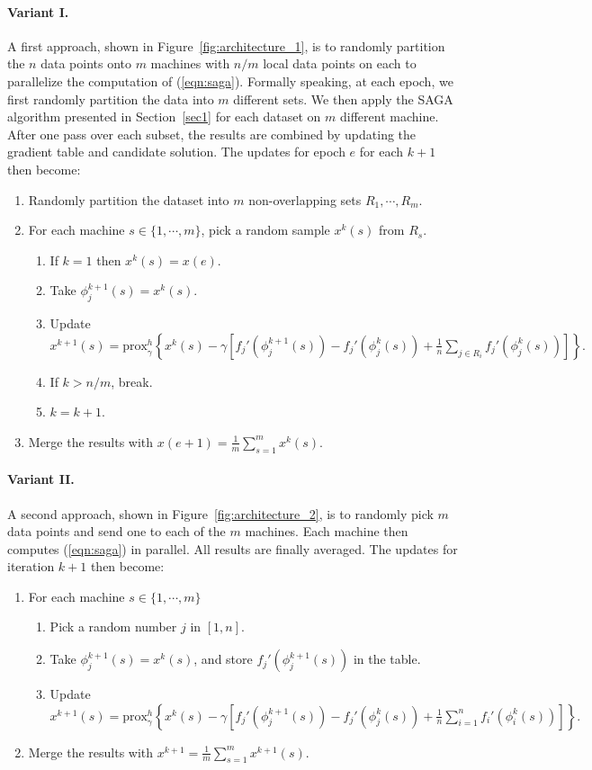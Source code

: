 \documentclass[a4paper,11pt]{article}
\newcommand{\eqnref}[1]{(\ref{eqn:#1})}
\newcommand{\figref}[1]{Figure~\ref{fig:#1}}
\newcommand{\prox}{\textrm{prox}}
\begin{document}
\paragraph{Variant I.} A first approach, shown in \figref{architecture_1}, is to
randomly partition the $n$ data points onto $m$ machines with $n/m$ local data
points on each to parallelize the computation of \eqnref{saga}. Formally
speaking, at each epoch, we first randomly partition the data into $m$ different
sets. We then apply the SAGA algorithm presented in Section~\ref{sec1} for each
dataset on $m$ different machine. After one pass over each subset, the results
are combined by updating the gradient table and candidate solution. The updates
for epoch $e$ for each $k+1$ then become:
\begin{enumerate}
	\item Randomly partition the dataset into $m$ non-overlapping sets $R_1,
		\cdots, R_m$.
	\item For each machine $s \in \{ 1, \cdots, m \}$, pick a random sample
		$x^k(s)$ from $R_s$.
	\begin{enumerate}
		\item If $ k = 1 $ then $x^k(s) = x(e)$.
		\item Take $\phi_j^{k+1}(s) = x^k(s)$.
		\item Update $x^{k+1}(s) = \prox_\gamma^h \left\{ 
			x^k(s) - \gamma \left[ f_j'(\phi_j^{k+1}(s)) - f_j'(\phi_j^k(s))
			+ \frac1n \sum_{j \in R_i} f_j'(\phi_j^k(s)) \right] \right\}.$
		\item If $ k > n/m$, break.
		\item $k = k+1$.
	\end{enumerate}	
	\item Merge the results with $ x(e+1) = \frac{1}{m} \sum_{s=1}^m x^k(s)$.
\end{enumerate}

\paragraph{Variant II.} A second approach, shown in \figref{architecture_2},
is to randomly pick $m$ data points and send one to each of the $m$ machines.
Each machine then computes \eqnref{saga} in parallel. All results are finally
averaged. The updates for iteration $k+1$ then become:
\begin{enumerate}	
	\item For each machine $s \in \{ 1, \cdots, m \}$
	\begin{enumerate}
		\item Pick a random number $j$ in $[1, n]$.
		\item Take $\phi_j^{k+1}(s) = x^k(s)$, and store $f_j'(\phi_j^{k+1}(s))$
			in the table.
		\item Update $x^{k+1}(s) = \prox_\gamma^h \left\{
			x^k(s) - \gamma \left[ f_j'(\phi_j^{k+1}(s)) - f_j'(\phi_j^k(s))
			+ \frac1n \sum_{i=1}^n f_i'(\phi_i^k(s)) \right] \right\}.$
	\end{enumerate}
	\item Merge the results with $ x^{k+1} = \frac{1}{m} \sum_{s=1}^m
		x^{k+1}(s)$.
\end{enumerate}
\end{document}
